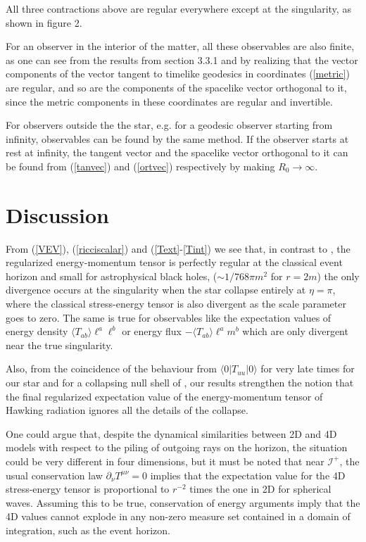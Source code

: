 \documentclass[reprint,amsmath,amssymb,aps,nofootinbib]{revtex4-1}
\begin{document}
All three contractions above are regular everywhere except at the singularity, as shown in figure 2.

For an observer in the interior of the matter, all these observables are also finite, as one can see from the results from section 3.3.1 and by realizing that the vector components of the vector tangent to timelike geodesics in coordinates (\ref{metric}) are regular, and so are the components of the spacelike vector orthogonal to it, since the metric components in these coordinates are regular and invertible.

For observers outside the the star, e.g. for a geodesic observer starting from infinity, observables can be found by the same method. If the observer starts at rest at infinity, the tangent vector and the spacelike vector orthogonal to it can be found from (\ref{tanvec}) and (\ref{ortvec}) respectively by making $R_0\to\infty$. 

\section{Discussion}
From (\ref{VEV}), (\ref{ricciscalar}) and (\ref{Text}-\ref{Tint}) we see that, in contrast to \cite{Laura}, the regularized energy-momentum tensor is perfectly regular at the classical event horizon and small for astrophysical black holes, ($\sim 1/768\pi m^{2}$ for $r=2m$)
the only divergence occurs at the singularity when the star collapse entirely at $\eta=\pi$, where the classical stress-energy tensor is also divergent as the scale parameter goes to zero. The same is true for observables like the expectation values of energy density $\langle T_{ab}\rangle\ell^a\ell^b$ or energy flux $-\langle T_{ab}\rangle\ell^am^b$ which are only divergent near the true singularity.%

Also, from the coincidence of the behaviour from $\langle0|T_{uu}|0\rangle$ for very late times for our star and for a collapsing null shell of \cite{DFU}, our results strengthen the notion that the final regularized expectation value of the energy-momentum tensor of Hawking radiation ignores all the details of the collapse.

One could argue that, despite the dynamical similarities between 2D and 4D models with respect to the piling of outgoing rays on the horizon, the situation could be very different in four dimensions, but it must be noted that near $\mathscr I^+$, the usual conservation law $\partial_\nu T^{\mu\nu}=0$ implies \cite{Ring} that the expectation value for the 4D stress-energy tensor is proportional to $r^{-2}$ times the one in 2D for spherical waves. Assuming this to be true, conservation of energy arguments imply that the 4D values cannot explode in any non-zero measure set contained in a domain of integration, such as the event horizon.
\end{document}
